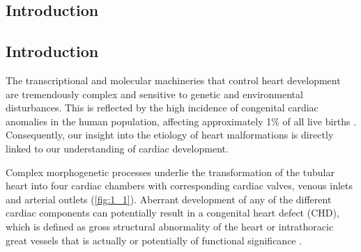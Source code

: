 

\begin{refsection}
\chapter{Introduction} %

\label{Chapter1} %



\section{Introduction}

\begin{sloppypar} The transcriptional and molecular machineries that control heart development are tremendously complex and sensitive to genetic and environmental disturbances. This is reflected by the high incidence of congenital cardiac anomalies in the human population, affecting approximately 1\% of all live births \cite{hoffman2002incidence}. Consequently, our insight into the etiology of heart malformations is directly linked to our understanding of cardiac development. \end{sloppypar}

Complex morphogenetic processes underlie the transformation of the tubular heart into four cardiac chambers with corresponding cardiac valves, venous inlets and arterial outlets (\cref{fig:1_1}). Aberrant development of any of the different cardiac components can potentially result in a congenital heart defect (CHD), which is defined as gross structural abnormality of the heart or intrathoracic great vessels that is actually or potentially of functional significance \cite{mitchell1971congenital}.


\end{refsection}
